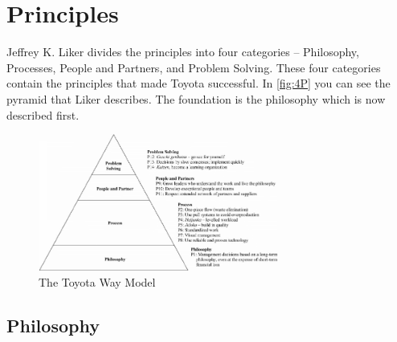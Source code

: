 \documentclass[11pt,a4paper]{article}
\begin{document}
\section{Principles}

Jeffrey K. Liker divides the principles into four categories -- Philosophy,
Processes, People and Partners, and Problem Solving. These four categories
contain the principles that made Toyota successful. In \autoref{fig:4P} you
can see the pyramid that Liker describes. The foundation is the philosophy
which is now described first.

\begin{figure}[h] 
  \centering
     \includegraphics[width=0.7\textwidth]{4P.png}
  \caption{The Toyota Way Model}
  \label{fig:4P}
\end{figure}

\subsection{Philosophy}
\end{document}
